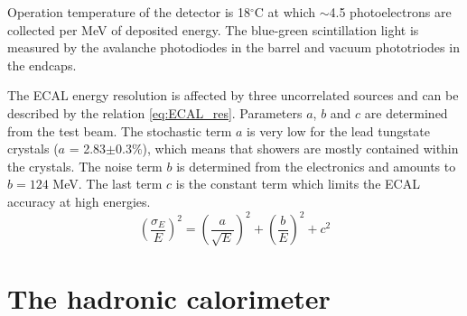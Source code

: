 \par Operation temperature of the detector is 18$^\circ$C at which $\sim$4.5 photoelectrons are collected per MeV of deposited energy. The blue-green scintillation light is measured by the avalanche photodiodes in the barrel and vacuum phototriodes in the endcaps.   
\par The ECAL energy resolution is affected by three uncorrelated sources and can be described by the relation \ref{eq:ECAL_res}. Parameters $a$, $b$ and $c$ are determined from the test beam. The stochastic term $a$ is very low for the lead tungstate crystals ($a$ = 2.83$\pm$0.3$\%$), which means that showers are mostly contained within the crystals. The noise term $b$ is determined from the electronics and amounts to $b=124$ MeV. The last term $c$ is the constant term which limits the ECAL accuracy at high energies.   
\begin{equation}
\left(\frac{\sigma_E}{E}\right)^2 = \left(\frac{a}{\sqrt{E}}\right)^2 + \left(\frac{b}{E}\right)^2 + c^2
\label{eq:ECAL_res}
\end{equation}   


\section{The hadronic calorimeter}

